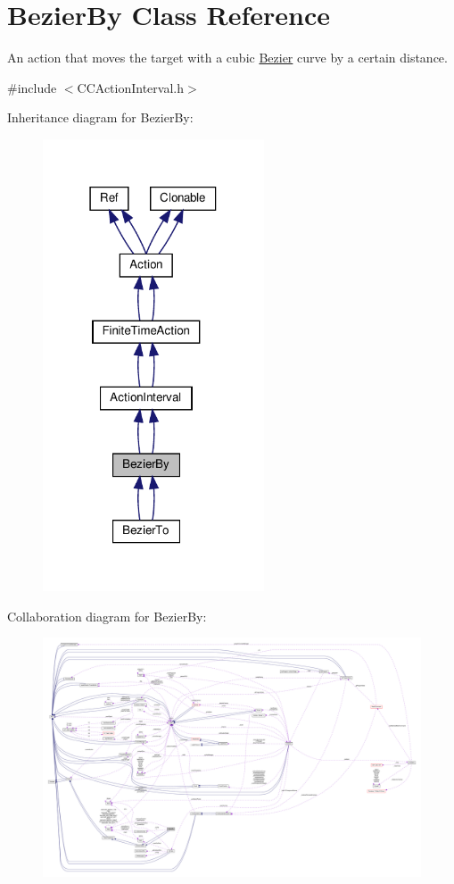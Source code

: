 \hypertarget{classBezierBy}{}\section{Bezier\+By Class Reference}
\label{classBezierBy}


An action that moves the target with a cubic \hyperlink{structBezier}{Bezier} curve by a certain distance.  




{\ttfamily \#include $<$C\+C\+Action\+Interval.\+h$>$}



Inheritance diagram for Bezier\+By\+:
\nopagebreak
\begin{figure}[H]
\begin{center}
\leavevmode
\includegraphics[width=186pt]{classBezierBy__inherit__graph}
\end{center}
\end{figure}


Collaboration diagram for Bezier\+By\+:
\nopagebreak
\begin{figure}[H]
\begin{center}
\leavevmode
\includegraphics[width=350pt]{classBezierBy__coll__graph}
\end{center}
\end{figure}
